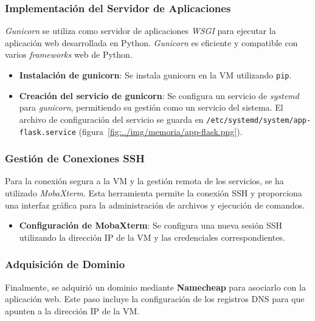 
\subsubsection{Implementación del Servidor de Aplicaciones}

\textit{Gunicorn} se utiliza como servidor de aplicaciones \textit{WSGI} para ejecutar la aplicación web desarrollada en Python. \textit{Gunicorn} es eficiente y compatible con varios \textit{frameworks} web de Python.

\begin{itemize}
	\item \textbf{Instalación de gunicorn}: Se instala gunicorn en la VM utilizando \texttt{pip}.
	\item \textbf{Creación del servicio de gunicorn}: Se configura un servicio de \textit{systemd} para \textit{gunicorn}, permitiendo su gestión como un servicio del sistema. El archivo de configuración del servicio se guarda en \texttt{/etc/systemd/system/app-flask.service} (figura~\ref{fig:../img/memoria/app-flask.png}).
\end{itemize}


\subsubsection{Gestión de Conexiones SSH}

Para la conexión segura a la VM y la gestión remota de los servicios, se ha utilizado \textit{MobaXterm}. Esta herramienta permite la conexión SSH y proporciona una interfaz gráfica para la administración de archivos y ejecución de comandos.

\begin{itemize}
	\item \textbf{Configuración de MobaXterm}: Se configura una nueva sesión SSH utilizando la dirección IP de la VM y las credenciales correspondientes.
\end{itemize}

\subsubsection{Adquisición de Dominio}

Finalmente, se adquirió un dominio mediante \textbf{Namecheap} para asociarlo con la aplicación web. Este paso incluye la configuración de los registros DNS para que apunten a la dirección IP de la VM.

